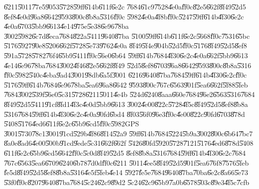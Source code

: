 \U{6211}\U{5011}\U{77e5}\U{9053}\U{5728}\U{59ff}\U{614b}\U{611f}\U{6e2c}%
\U{7684}\U{61c9}\U{7528}\U{4e0a}\U{ff0c}\U{82e5}\U{662f}\U{8f49}\U{52d5}%
\U{8ef8}\U{4e0d}\U{96a8}\U{6642}\U{9593}\U{800c}\U{8b8a}\U{5316}\U{ff0c}%
\U{5982}\U{4e0a}\U{4f8b}\U{ff0c}\U{5247}\U{59ff}\U{614b}\U{4f30}\U{6e2c}%
\U{4e0a}\U{6703}\U{5bb9}\U{6613}\U{4e14}\U{975e}\U{5e38}\U{6e96}\U{78ba}%
\U{3002}\U{5982}\U{6c7d}\U{8eca}\U{7684}\U{822a}\U{5411}\U{9640}\U{87ba}%
\U{5100}\U{59ff}\U{614b}\U{611f}\U{6e2c}\U{5668}\U{ff0c}\U{7531}\U{65bc}%
\U{5176}\U{5927}\U{90e8}\U{5206}\U{662f}\U{5728}\U{5e73}\U{9762}\U{4e0a}%
\U{8f49}\U{5f4e}\U{904b}\U{52d5}\U{ff0c}\U{5176}\U{8f49}\U{52d5}\U{8ef8}%
\U{591a}\U{5728}\U{5782}\U{76f4}\U{65b9}\U{5411}\U{ff0c}\U{56e0}\U{6b64}%
\U{59ff}\U{614b}\U{7684}\U{4f30}\U{6e2c}\U{4e0a}\U{662f}\U{5bb9}\U{6613}%
\U{4e14}\U{6e96}\U{78ba}\U{7684}\U{3002}\U{4f46}\U{82e5}\U{662f}\U{8f49}%
\U{52d5}\U{8ef8}\U{6703}\U{96a8}\U{6642}\U{9593}\U{800c}\U{8b8a}\U{5316}%
\U{ff0c}\U{5982}\U{540c}\U{4eba}\U{9ad4}\U{3001}\U{98db}\U{6a5f}\U{3001}%
\U{6216}\U{9640}\U{87ba}\U{7684}\U{59ff}\U{614b}\U{4f30}\U{6e2c}\U{ff0c}%
\U{5176}\U{59ff}\U{614b}\U{7684}\U{6e96}\U{78ba}\U{5ea6}\U{96a8}\U{6642}%
\U{9593}\U{800c}\U{767c}\U{6563}\U{901f}\U{5ea6}\U{662f}\U{5f88}\U{5feb}%
\U{7684}\U{3002}\U{539f}\U{56e0}\U{5c31}\U{5728}\U{6211}\U{5011}\U{4e4b}%
\U{524d}\U{6240}\U{8aaa}\U{660e}\U{7684}\U{96e2}\U{6563}\U{5316}\U{7684}%
\U{8f49}\U{52d5}\U{5411}\U{91cf}\U{8fd1}\U{4f3c}\U{4e0d}\U{5bb9}\U{6613}%
\U{3002}\U{4e00}\U{822c}\U{5728}\U{4f5c}\U{8f49}\U{52d5}\U{8ef8}\U{8b8a}%
\U{5316}\U{7684}\U{59ff}\U{614b}\U{4f30}\U{6e2c}\U{4e0a}\U{90fd}\U{6bd4}%
\U{8f03}\U{56f0}\U{96e3}\U{ff0c}\U{4e00}\U{822c}\U{90fd}\U{6703}\U{878d}%
\U{5408}\U{5176}\U{4ed6}\U{611f}\U{6e2c}\U{65b9}\U{6cd5}\U{ff0c}\U{5982}GPS%
\U{3001}\U{5730}\U{78c1}\U{3001}\U{91cd}\U{529b}\U{4f86}\U{8f14}\U{52a9}%
\U{59ff}\U{614b}\U{7684}\U{5224}\U{5b9a}\U{3002}\U{800c}\U{6b64}\U{7bc7}%
\U{8a0e}\U{8ad6}\U{4e00}\U{500b}\U{91cd}\U{9ede}\U{5c31}\U{662f}\U{662f}%
\U{5426}\U{80fd}\U{5920}\U{5728}\U{7121}\U{5176}\U{4ed6}\U{878d}\U{5408}%
\U{611f}\U{6e2c}\U{65b9}\U{6cd5}\U{6642}\U{ff0c}\U{5c0d}\U{8f49}\U{52d5}%
\U{8ef8}\U{8b8a}\U{5316}\U{7684}\U{59ff}\U{614b}\U{4f30}\U{6e2c}\U{7684}%
\U{767c}\U{6563}\U{5ea6}\U{6709}\U{6240}\U{6b78}\U{7d0d}\U{ff0c}\U{6211}%
\U{5011}\U{4ee5}\U{8f49}\U{52d5}\U{901f}\U{5ea6}\U{76f8}\U{7576}\U{5feb}%
\U{fe5d}\U{8f49}\U{52d5}\U{8ef8}\U{8b8a}\U{5316}\U{4e5f}\U{5feb}\U{4e14}%
\U{5927}\U{fe5e}\U{7684}\U{9640}\U{87ba}\U{70ba}\U{6e2c}\U{8a66}\U{5e73}%
\U{53f0}\U{ff0c}\U{8207}\U{9640}\U{87ba}\U{7684}\U{5c24}\U{62c9}\U{89d2}%
\U{5c24}\U{62c9}\U{65b9}\U{7a0b}\U{6578}\U{503c}\U{89e3}\U{4f5c}\U{7cfb}%
